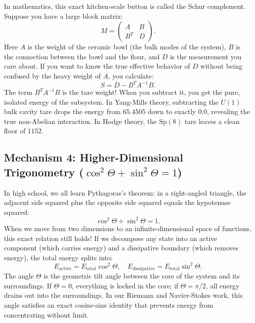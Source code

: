 \documentclass[11pt,a4paper]{article}
\theoremstyle{definition}
\begin{document}
In mathematics, this exact kitchen-scale button is called the Schur complement. Suppose you have a large block matrix:
\begin{equation}
M = \begin{pmatrix} A & B \\ B^T & D \end{pmatrix}.
\end{equation}
Here $A$ is the weight of the ceramic bowl (the bulk modes of the system), $B$ is the connection between the bowl and the flour, and $D$ is the measurement you care about. If you want to know the true effective behavior of $D$ without being confused by the heavy weight of $A$, you calculate:
\begin{equation}
S = D - B^T A^{-1} B.
\end{equation}
The term $B^T A^{-1} B$ is the tare weight! When you subtract it, you get the pure, isolated energy of the subsystem. In Yang-Mills theory, subtracting the $U(1)$ bulk cavity tare drops the energy from $65.4505$ down to exactly $0.0$, revealing the true non-Abelian interaction. In Hodge theory, the $\mathrm{Sp}(8)$ tare leaves a clean floor of $1152$.

\subsection{Mechanism 4: Higher-Dimensional Trigonometry ($\cos^2\Theta + \sin^2\Theta = 1$)}
In high school, we all learn Pythagoras's theorem: in a right-angled triangle, the adjacent side squared plus the opposite side squared equals the hypotenuse squared:
\begin{equation}
\cos^2\Theta + \sin^2\Theta = 1.
\end{equation}
When we move from two dimensions to an infinite-dimensional space of functions, this exact relation still holds! If we decompose any state into an active component (which carries energy) and a dissipative boundary (which removes energy), the total energy splits into:
\begin{equation}
E_{\mathrm{active}} = E_{\mathrm{total}} \cos^2\Theta, \quad E_{\mathrm{dissipative}} = E_{\mathrm{total}} \sin^2\Theta.
\end{equation}
The angle $\Theta$ is the geometric tilt angle between the core of the system and its surroundings. If $\Theta = 0$, everything is locked in the core; if $\Theta = \pi/2$, all energy drains out into the surroundings. In our Riemann and Navier-Stokes work, this angle satisfies an exact cosine-sine identity that prevents energy from concentrating without limit.
\end{document}

